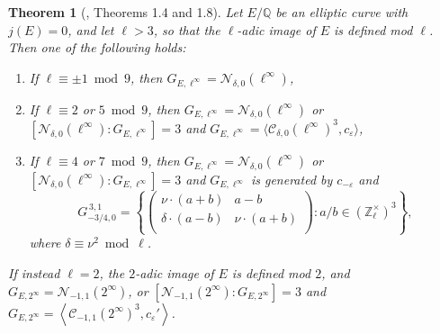\documentclass[11pt]{amsart}
\newtheorem{thm}[defn]{Theorem}
\theoremstyle{definition}
\newcommand{\Q}{\mathbb Q}
\newcommand{\Z}{\mathbb Z}
\newcommand{\cC}{\mathcal{C}}
\begin{document}
\begin{thm}[\cite{lozano-galoiscm}, Theorems 1.4 and 1.8]\label{thm-jzero-goodredn} Let $E/\Q$ be an elliptic curve with $j(E)=0$, and let $\ell > 3$, so that the $\ell$-adic image of $E$ is defined mod $\ell$. Then one of the following holds:
	\begin{enumerate}
	\item If $\ell\equiv \pm 1\bmod 9$, then $G_{E,\ell^{\infty}}=\mathcal{N}_{\delta,0}(\ell^{\infty})$,
	\item If $\ell\equiv 2$ or $5\bmod 9$, then $G_{E,\ell^{\infty}}=\mathcal{N}_{\delta,0}(\ell^{\infty})$ or $[\mathcal{N}_{\delta,0}(\ell^{\infty}) : G_{E,\ell^{\infty}}] = 3$ and  $G_{E,\ell^{\infty}}=\langle \cC_{\delta,0}(\ell^{\infty})^3, c_\varepsilon \rangle $,
	\item If $\ell\equiv 4$ or $7\bmod 9$, then $G_{E,\ell^{\infty}} = \mathcal{N}_{\delta,0}(\ell^{\infty})$ or $[\mathcal{N}_{\delta,0}(\ell^{\infty}) : G_{E,\ell^{\infty}}] = 3$ and $G_{E,\ell^\infty}$ is generated by $c_{-\varepsilon}$ and 
 \[ G^{\, 3,1}_{-3/4,0} = \left\{  \left(\begin{array}{cc} \nu\cdot (a + b) & a - b \\ \delta\cdot (a - b) & \nu\cdot (a + b)\\ \end{array}\right) : a/b \in (\Z_\ell^\times)^3\right\},  \]
 where $\delta \equiv \nu^2 \bmod \ell$.
\end{enumerate}
If instead $\ell = 2$, the $2$-adic image of $E$ is defined mod $2$, and $G_{E,2^\infty} = \mathcal{N}_{-1,1}(2^\infty)$, or $[\mathcal{N}_{-1,1}(2^\infty):G_{E,2^\infty}]=3$ and $G_{E,2^\infty} =\left\langle \cC_{-1,1}(2^\infty)^3, c_{\varepsilon}' \right\rangle$.
\end{thm}
\end{document}
